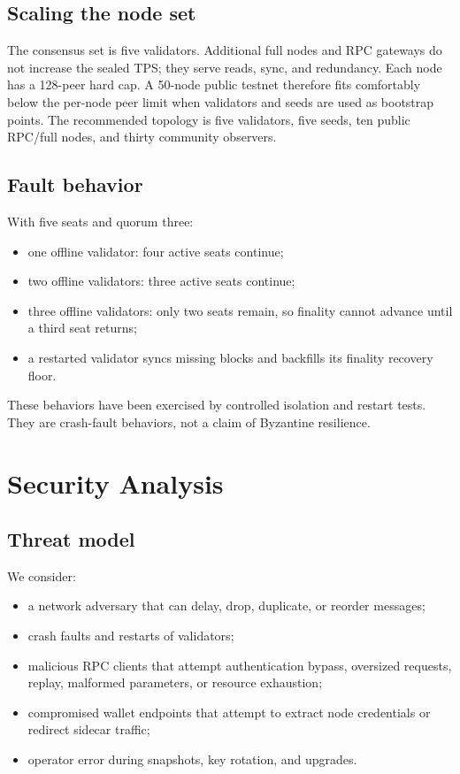 \documentclass[11pt,a4paper]{article}
\begin{document}
\subsection{Scaling the node set}

The consensus set is five validators. Additional full nodes and RPC gateways
do not increase the sealed TPS; they serve reads, sync, and redundancy. Each
node has a 128-peer hard cap. A 50-node public testnet therefore fits
comfortably below the per-node peer limit when validators and seeds are used
as bootstrap points. The recommended topology is five validators, five seeds,
ten public RPC/full nodes, and thirty community observers.

\subsection{Fault behavior}

With five seats and quorum three:
\begin{itemize}[leftmargin=*]
  \item one offline validator: four active seats continue;
  \item two offline validators: three active seats continue;
  \item three offline validators: only two seats remain, so finality cannot
        advance until a third seat returns;
  \item a restarted validator syncs missing blocks and backfills its finality
        recovery floor.
\end{itemize}
These behaviors have been exercised by controlled isolation and restart
tests. They are crash-fault behaviors, not a claim of Byzantine resilience.

\section{Security Analysis}

\subsection{Threat model}

We consider:
\begin{itemize}[leftmargin=*]
  \item a network adversary that can delay, drop, duplicate, or reorder
        messages;
  \item crash faults and restarts of validators;
  \item malicious RPC clients that attempt authentication bypass, oversized
        requests, replay, malformed parameters, or resource exhaustion;
  \item compromised wallet endpoints that attempt to extract node
        credentials or redirect sidecar traffic;
  \item operator error during snapshots, key rotation, and upgrades.
\end{itemize}
\end{document}
